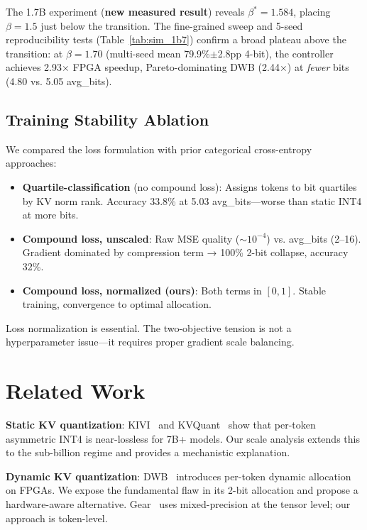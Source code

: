 \documentclass{article}
\begin{document}
The 1.7B experiment (\textbf{new measured result}) reveals $\beta^*=1.584$, placing $\beta=1.5$ just below the transition. The fine-grained sweep and 5-seed reproducibility tests (Table~\ref{tab:sim_1b7}) confirm a broad plateau above the transition: at $\beta=1.70$ (multi-seed mean 79.9\%$\pm$2.8pp 4-bit), the controller achieves 2.93$\times$ FPGA speedup, Pareto-dominating DWB (2.44$\times$) at \emph{fewer} bits (4.80 vs. 5.05 avg\_bits).

\subsection{Training Stability Ablation}

We compared the loss formulation with prior categorical cross-entropy approaches:

\begin{itemize}
\item \textbf{Quartile-classification} (no compound loss): Assigns tokens to bit quartiles by KV norm rank. Accuracy 33.8\% at 5.03 avg\_bits---worse than static INT4 at more bits.
\item \textbf{Compound loss, unscaled}: Raw MSE quality ($\sim 10^{-4}$) vs. avg\_bits (2--16). Gradient dominated by compression term → 100\% 2-bit collapse, accuracy 32\%.
\item \textbf{Compound loss, normalized (ours)}: Both terms in $[0,1]$. Stable training, convergence to optimal allocation.
\end{itemize}

Loss normalization is essential. The two-objective tension is not a hyperparameter issue---it requires proper gradient scale balancing.

\section{Related Work}

\textbf{Static KV quantization}: KIVI~\citep{liu2024kivi} and KVQuant~\citep{hooper2024kvquant} show that per-token asymmetric INT4 is near-lossless for 7B+ models. Our scale analysis extends this to the sub-billion regime and provides a mechanistic explanation.

\textbf{Dynamic KV quantization}: DWB~\citep{haeri2026dwb} introduces per-token dynamic allocation on FPGAs. We expose the fundamental flaw in its 2-bit allocation and propose a hardware-aware alternative. Gear~\citep{kang2024gear} uses mixed-precision at the tensor level; our approach is token-level.
\end{document}
